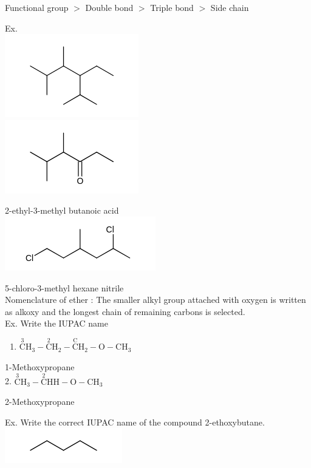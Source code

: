 \documentclass[10pt]{article}
\begin{document}
Functional group $>$ Double bond $>$ Triple bond $>$ Side chain

Ex.\\
\includegraphics{smile-5e65898a1d176aba4463be9b0b3a398b8a96f67b}\\
\includegraphics{smile-f1d17dbb2e790df785553e444bf7343317af2e79}

2-ethyl-3-methyl butanoic acid\\
\includegraphics{smile-bea0be781518577d59f0b9d5412546a2061b1dea}

5-chloro-3-methyl hexane nitrile\\
Nomenclature of ether : The smaller alkyl group attached with oxygen is written as alkoxy and the longest chain of remaining carbons is selected.\\
Ex. Write the IUPAC name

\begin{enumerate}
  \item $\stackrel{3}{\mathrm{C}} \mathrm{H}_{3}-\stackrel{2}{\mathrm{C}} \mathrm{H}_{2}-\stackrel{\mathrm{C}}{\mathrm{C}} \mathrm{H}_{2}-\mathrm{O}-\mathrm{CH}_{3}$
\end{enumerate}

1-Methoxypropane\\
2. $\stackrel{3}{\mathrm{C}} \mathrm{H}_{3}-\stackrel{2}{\mathrm{C}} \mathrm{H} \mathrm{H}-\mathrm{O}-\mathrm{CH}_{3}$

2-Methoxypropane

Ex. Write the correct IUPAC name of the compound 2-ethoxybutane.\\
\includegraphics{smile-67395df032c2b8644bdac09223689e8686451b78}
\end{document}
